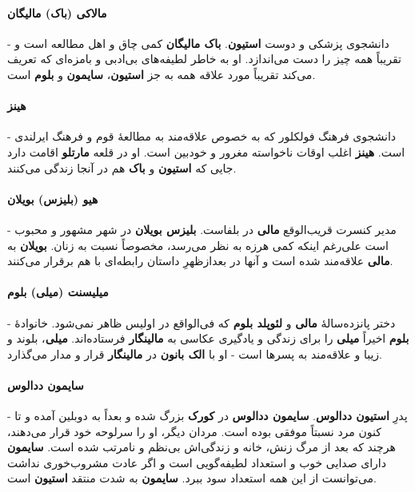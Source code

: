 \documentclass[12pt]{book}
\newcommand{\noun}[1]{{\textbf{#1}}}
\begin{document}
    \paragraph{\noun{مالاکی (باک)  مالیگان}\protect{}} -
    دانشجوی پزشکی و دوست \noun{استیون}. \noun{باک مالیگان‬} کمی چاق و اهل مطالعه است و تقریباً همه چیز را دست می‌اندازد. او به خاطر لطیفه‌های بی‌ادبی و بامزه‌ای که تعریف می‌کند تقریباً مورد علاقه همه به جز \noun{استیون}، \noun{سایمون}  و \noun{بلوم} است.
    \paragraph{\noun{هینز}\protect{}} -
    دانشجوی فرهنگ فولکلور که به خصوص علاقه‌مند به مطالعهٔ قوم و فرهنگ ایرلندی است. \noun{هینز}  اغلب اوقات ناخواسته مغرور و خودبین است. او در قلعه \noun{مارتلو} اقامت دارد جایی که \noun{استیون} و \noun{باک}  هم در آنجا زندگی می‌کنند.
    \paragraph{\noun{هیو (بلیزس) بویلان}\protect{}} -
    مدیر کنسرت قریب‌الوقع \noun{مالی} در بلفاست. \noun{بلیزس بویلان‬} در شهر مشهور و محبوب است علی‌رغم اینکه کمی هرزه به نظر می‌رسد، مخصوصاً نسبت به زنان. \noun{بویلان} به \noun{مالی} علاقه‌مند شده است و آنها در بعدازظهرِ داستان رابطه‌ای با هم برقرار می‌کنند.
    \paragraph{\noun{میلیسنت (میلی) بلوم}\protect{}} -
    دختر پانزده‌سالهٔ \noun{مالی} و \noun{لئوپلد بلوم} که فی‌الواقع در اولیس ظاهر نمی‌شود. خانوادهٔ \noun{بلوم} اخیراً \noun{میلی} را برای زندگی و یادگیری عکاسی به \noun{مالینگار} فرستاده‌اند. \noun{میلی}، بلوند و زیبا و علاقه‌مند به پسرها است - او با \noun{الک بانون} در \noun{مالینگار} قرار و مدار می‌گذارد.
    \paragraph{\noun{سایمون ددالوس}\protect{}} -
    پدرِ \noun{استیون ددالوس}. \noun{سایمون  ددالوس} در \noun{کورک} بزرگ شده و بعداً به دوبلین آمده و تا کنون مرد نسبتاً موفقی بوده است. مردان دیگر، او را سرلوحه خود قرار می‌دهند، هرچند که بعد از مرگ زنش، خانه و زندگی‌اش بی‌نظم و نامرتب شده است. \noun{سایمون}  دارای صدایی خوب و استعداد لطیفه‌گویی است و اگر عادت مشروب‌خوری نداشت می‌توانست از این همه استعداد سود ببرد. \noun{سایمون}  به شدت منتقد \noun{استیون} است.
\end{document}
